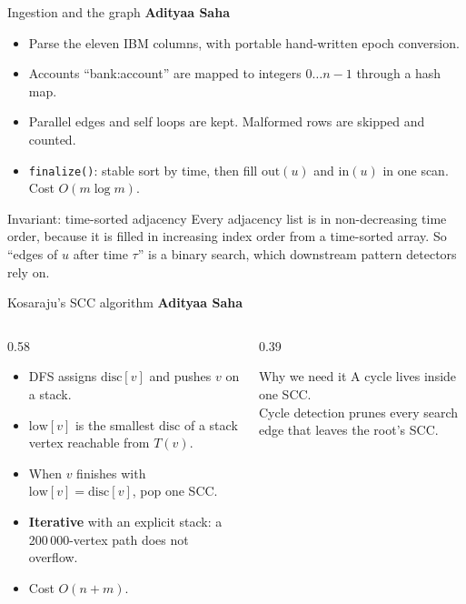 \documentclass[aspectratio=169,11pt]{beamer}
\newcommand{\memberbadge}[1]{%
  \hfill{\small\bfseries\color{memberred}#1}%
}
\begin{document}
\begin{frame}{Ingestion and the graph \memberbadge{Adityaa Saha}}
\begin{itemize}
\setlength{\itemsep}{0.45em}
\item Parse the eleven IBM columns, with portable hand-written epoch conversion.
\item Accounts ``bank:account'' are mapped to integers $0\dots n-1$ through a hash map.
\item Parallel edges and self loops are kept. Malformed rows are skipped and counted.
\item \texttt{finalize()}: stable sort by time, then fill $\text{out}(u)$ and $\text{in}(u)$ in one scan. Cost $O(m \log m)$.
\end{itemize}

\vspace{0.35cm}
\begin{block}{Invariant: time-sorted adjacency}
Every adjacency list is in non-decreasing time order, because it is filled in increasing index order from a time-sorted array. So ``edges of $u$ after time $\tau$'' is a binary search, which downstream pattern detectors rely on.
\end{block}
\end{frame}

\begin{frame}{Kosaraju's SCC algorithm \memberbadge{Adityaa Saha}}
\begin{columns}[T,onlytextwidth]
\begin{column}{0.58\textwidth}
\begin{itemize}
\setlength{\itemsep}{0.55em}
\item DFS assigns $\text{disc}[v]$ and pushes $v$ on a stack.
\item $\text{low}[v]$ is the smallest $\text{disc}$ of a stack vertex reachable from $T(v)$.
\item When $v$ finishes with $\text{low}[v] = \text{disc}[v]$, pop one SCC.
\item \textbf{Iterative} with an explicit stack: a 200\,000-vertex path does not overflow.
\item Cost $O(n + m)$.
\end{itemize}
\end{column}
\begin{column}{0.39\textwidth}
\vspace{0.2cm}
\begin{block}{Why we need it}
A cycle lives inside one SCC.\\
Cycle detection prunes every search edge that leaves the root's SCC.
\end{block}
\end{column}
\end{columns}
\end{frame}
\end{document}
